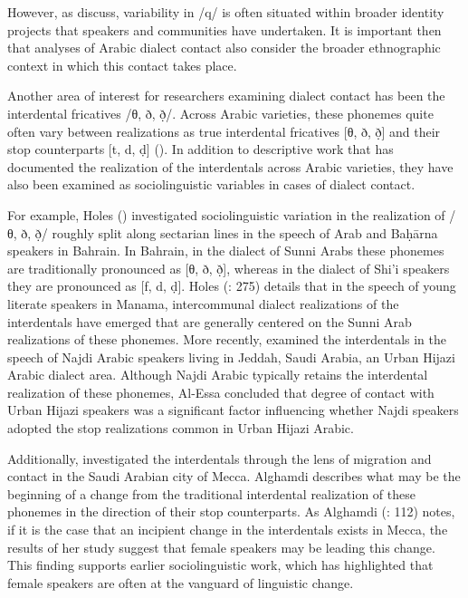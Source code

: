 \documentclass[output=paper]{langsci/langscibook}
\begin{document}
However, as \citet{CotterHoresh2015} discuss, variability in /q/ is often situated within broader identity projects that speakers and communities have undertaken. It is important then that analyses of Arabic dialect contact also consider the broader ethnographic context in which this contact takes place. 

Another area of interest for researchers examining dialect contact has been the interdental fricatives /θ, ð, ð̣/. Across Arabic varieties, these phonemes quite often vary between realizations as true interdental fricatives [θ, ð, ð̣] and their stop counterparts [t, d, ḍ] (\citealt{Al-Wer1997,Al-Wer2003daad,Al-Wer2011}). In addition to descriptive work that has documented the realization of the interdentals across Arabic varieties, they have also been examined as sociolinguistic variables in cases of dialect contact. 

  For example, Holes (\citeyear{Holes1987,Holes1995}) investigated sociolinguistic variation in the realization of /θ, ð, ð̣/ roughly split along sectarian lines in the speech of Arab and Baḥārna speakers in Bahrain. In Bahrain, in the dialect of Sunni Arabs these phonemes are traditionally pronounced as [θ, ð, ð̣], whereas in the dialect of Shi’i speakers they are pronounced as [f, d, ḍ]. Holes (\citeyear{Holes1995}: 275) details that in the speech of young literate speakers in Manama, intercommunal dialect realizations of the interdentals have emerged that are generally centered on the Sunni Arab realizations of these phonemes. More recently, \citet{Al-Essa2008} examined the interdentals in the speech of Najdi Arabic speakers living in Jeddah, Saudi Arabia, an Urban Hijazi Arabic dialect area. Although Najdi Arabic typically retains the interdental realization of these phonemes, Al-Essa concluded that degree of contact with Urban Hijazi speakers was a significant factor influencing whether Najdi speakers adopted the stop realizations common in Urban Hijazi Arabic. 

Additionally, \citet{Alghamdi2014} investigated the interdentals through the lens of migration and contact in the Saudi Arabian city of Mecca. Alghamdi describes what may be the beginning of a change from the traditional interdental realization of these phonemes in the direction of their stop counterparts. As Alghamdi (\citeyear{Alghamdi2014}: 112) notes, if it is the case that an incipient change in the interdentals exists in Mecca, the results of her study suggest that female speakers may be leading this change. This finding supports earlier sociolinguistic work, which has highlighted that female speakers are often at the vanguard of linguistic change. 
\end{document}
